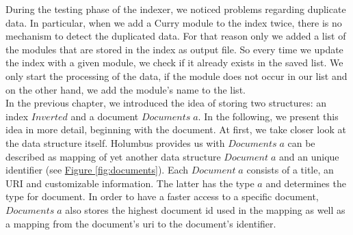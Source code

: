\documentclass[%
	pdftex,%
	a4paper,%
	oneside,%
	chapterprefix,%
	headsepline,%
	12pt%
]{scrbook}
\newcommand{\Conid}[1]{\mathit{#1}}
\newcommand{\Varid}[1]{\mathit{#1}}
\begin{document}
During the testing phase of the indexer, we noticed problems regarding
duplicate data. In particular, when we add a Curry module to the
index twice, there is no mechanism to detect the duplicated data. For
that reason only we added a list of the modules that are stored in the
index as output file. So every time we update the index with a given
module, we check if it already exists in the saved list. We only start
the processing of the data, if the module does not occur in our list
and on the other hand, we add the module's name to the list.\\

In the previous chapter, we introduced the idea of storing two
structures: an index \ensuremath{\Conid{Inverted}} and a document \ensuremath{\Conid{Documents}\;\Varid{a}}.  In the following, we present this
idea in more detail, beginning with the document. At first, we take
closer look at the data structure itself. Holumbus provides us with
\ensuremath{\Conid{Documents}\;\Varid{a}} can be described as mapping of yet another data
structure \ensuremath{\Conid{Document}\;\Varid{a}} and an unique identifier (see
\hyperref[fig:documents]{Figure \ref{fig:documents}}). Each \ensuremath{\Conid{Document}\;\Varid{a}} consists of a title, an URI and customizable information. The
latter has the type \ensuremath{\Varid{a}} and determines the type for document. In order
to have a faster access to a specific document, \ensuremath{\Conid{Documents}\;\Varid{a}} also
stores the highest document id used in the mapping as well as a
mapping from the document's uri to the document's identifier.\\
\end{document}
